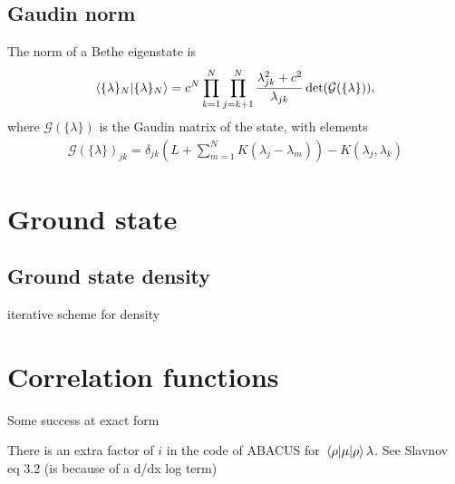 \documentclass[11pt, a4paper]{report} %
\begin{document}
\subsection{Gaudin norm}
The norm of a Bethe eigenstate is~\cite{Caux2007}
\begin{align}
  \braket{\{\lambda\}_N}{\{\lambda\}_N} = c^N \prod_{k=1}^N \prod_{j=k+1}^N \frac{\lambda_{jk}^2 + c^2}{\lambda_{jk}} \det(\mathcal{G}(\{\lambda\})),
\end{align}
where $\mathcal{G}(\{\lambda\})$ is the Gaudin matrix of the state, with elements
\begin{align}\label{eq:gaudin}
  \mathcal{G}(\{\lambda\})_{jk} = \delta_{jk} \left(L + \sum_{m=1}^{N}K(\lambda_j-\lambda_m)\right) - K(\lambda_j, \lambda_k)
\end{align}


\section{Ground state}
\subsection{Ground state density}
iterative scheme for density\cite{Zemyan2012}




\section{Correlation functions}
Some success at exact form~\cite{Nardis2016,slavnov89_calcul_scalar_produc_wave_funct}

There is an extra factor of $i$ in the code of ABACUS for $\expval{\mu}{\rho}{\lambda}$.
See Slavnov eq 3.2 (is because of a d/dx log term)
\end{document}
